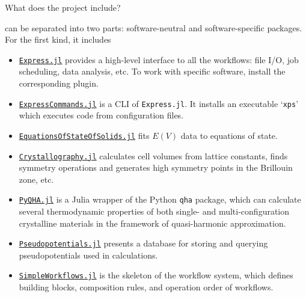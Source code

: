 \begin{frame}[allowframebreaks]{What does the \express{} project include?}
    \begin{figure}
        \centering
        \label{fig:components}
    \end{figure}

    \express{} can be separated into two parts: software-neutral and software-specific packages.
    For the first kind, it includes
        {\footnotesize
            \begin{itemize}
                \item \href{https://github.com/MineralsCloud/Express.jl}{\texttt{Express.jl}}
                      provides a high-level interface to all the
                      workflows: file I/O, job scheduling, data analysis, etc.
                      To work with specific software, install the corresponding plugin.
                \item \href{https://github.com/MineralsCloud/ExpressCommands.jl}{\texttt{ExpressCommands.jl}}
                      is a CLI of \texttt{Express.jl}. It installs an executable
                      `\texttt{xps}' which executes code from configuration files.
                \item \href{https://github.com/MineralsCloud/EquationsOfStateOfSolids.jl}{\texttt{EquationsOfStateOfSolids.jl}}
                      fits $E(V)$ data to equations of state.
                \item \href{https://github.com/MineralsCloud/Crystallography.jl}{\texttt{Crystallography.jl}}
                      calculates cell volumes from lattice constants, finds symmetry
                      operations and generates high symmetry points in the Brillouin zone, etc.
                \item \href{https://github.com/MineralsCloud/PyQHA.jl}{\texttt{PyQHA.jl}}
                      is a Julia wrapper of
                      the Python \texttt{qha} package, which can calculate
                      several thermodynamic properties of both single- and multi-configuration
                      crystalline materials in the framework of quasi-harmonic approximation.
                \item \href{https://github.com/MineralsCloud/Pseudopotentials.jl}{\texttt{Pseudopotentials.jl}} presents
                      a database for storing and querying pseudopotentials used in \ab{} calculations.
                \item \href{https://github.com/MineralsCloud/SimpleWorkflows.jl}{\texttt{SimpleWorkflows.jl}}
                      is the skeleton of the workflow system, which
                      defines building blocks, composition rules, and operation order of workflows.
            \end{itemize}
        }


\end{frame}
